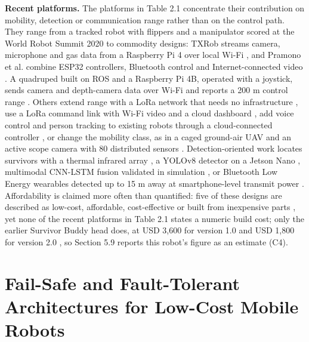\textbf{Recent platforms.} The platforms in Table 2.1 concentrate their contribution on mobility, detection or communication range rather than on the control path. They range from a tracked robot with flippers and a manipulator scored at the World Robot Summit 2020 \cite{megalingam2022} to commodity designs: TXRob streams camera, microphone and gas data from a Raspberry Pi 4 over local Wi-Fi \cite{verano2022}, and Pramono et al. combine ESP32 controllers, Bluetooth control and Internet-connected video \cite{pramono2024}. A quadruped built on ROS and a Raspberry Pi 4B, operated with a joystick, sends camera and depth-camera data over Wi-Fi and reports a 200 m control range \cite{deshmukh2025}. Others extend range with a LoRa network that needs no infrastructure \cite{manuel2022}, use a LoRa command link with Wi-Fi video and a cloud dashboard \cite{gehlot2025}, add voice control and person tracking to existing robots through a cloud-connected controller \cite{cafolla2026}, or change the mobility class, as in a caged ground-air UAV \cite{jia2025} and an active scope camera with 80 distributed sensors \cite{yamauchi2022}. Detection-oriented work locates survivors with a thermal infrared array \cite{kim2023}, a YOLOv8 detector on a Jetson Nano \cite{raghavan2026}, multimodal CNN-LSTM fusion validated in simulation \cite{khattab2025}, or Bluetooth Low Energy wearables detected up to 15 m away at smartphone-level transmit power \cite{cantizani2022}. Affordability is claimed more often than quantified: five of these designs are described as low-cost, affordable, cost-effective or built from inexpensive parts \cite{verano2022,pramono2024,kim2023,raghavan2026,deshmukh2025}, yet none of the recent platforms in Table 2.1 states a numeric build cost; only the earlier Survivor Buddy head does, at USD 3,600 for version 1.0 and USD 1,800 for version 2.0 \cite{murphy2011}, so Section 5.9 reports this robot's figure as an estimate (C4).

\section{Fail-Safe and Fault-Tolerant Architectures for Low-Cost Mobile Robots}

